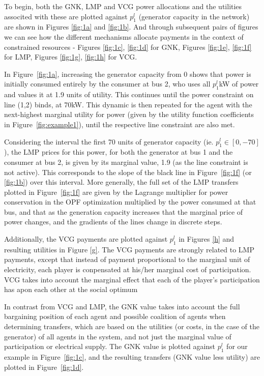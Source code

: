 To begin, both the GNK, LMP and VCG power allocations and the utilities associted with these are plotted against $p_1^l$ (generator capacity in the network) are shown in Figures \ref{fig:1a} and \ref{fig:1b}.
And through subsequent pairs of figures we can see how the different mechanisms allocate payments in the context of constrained resources - Figures \ref{fig:1c}, \ref{fig:1d} for GNK, Figures \ref{fig:1e}, \ref{fig:1f} for LMP, Figures \ref{fig:1g}, \ref{fig:1h} for VCG.

\iffigures
% 

\fi

In Figure~\ref{fig:1a}, increasing the generator capacity from $0$ shows that power is initially consumed entirely by the consumer at bus 2, 
who uses all $p_1^l$kW of power and values it at 1.9 units of utility. This continues until the power constraint on line (1,2) binds, at 70kW.  
This dynamic is then repeated for the agent with the next-highest marginal utility for power (given by the utility function coefficients in Figure~\ref{fig:example1}), until the respective line constraint are also met.

Considering the interval the first 70 units of generator capacity (ie. $p_1^l \in [0,-70]$), the LMP prices for this power, for both the generator at bus 1 and the consumer at bus 2, is given by its marginal value, 1.9 (as the line constraint is not active). This corresponds to the slope of the black line in Figure~\ref{fig:1f} (or \ref{fig:1b}) over this interval. 
More generally, the full set of the LMP transfers plotted in Figure~\ref{fig:1f} are given by the Lagrange multiplier for power conservation in the OPF optimization multiplied by the power consumed at that bus, and that as the generation capacity increases that the marginal price of power changes, and the gradients of the lines change in discrete steps.

Additionally, the VCG payments are plotted against $p_1^l$ in Figures \ref{h} and resulting utilities in Figure \ref{g}.
The VCG payments are strongly related to LMP payments, except that instead of payment proportional to the marginal unit of electricity, each player is conpensated at his/her marginal cost of participation.
VCG takes into account the marginal effect that each of the player's participation has apon each other at the social optimum

In contrast from VCG and LMP, the GNK value takes into account the full bargaining position of each agent and possible coalition of agents when determining transfers, which are based on the utilities (or costs, in the case of the generator) of all agents in the system, and not just the marginal value of participation or electrical supply.
The GNK value is plotted against $p_1^l$ for our example in Figure~\ref{fig:1c}, and the resulting transfers (GNK value less utility) are plotted in Figure~\ref{fig:1d}.

